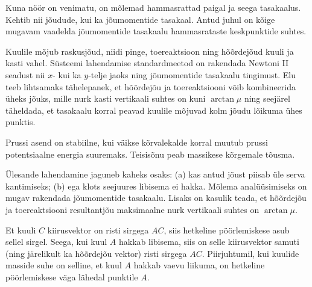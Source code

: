 \documentclass[10pt, twoside]{article}
\begin{document}
{%

\hint
Kuna nöör on venimatu, on mõlemad hammasrattad paigal ja seega tasakaalus. Kehtib nii jõudude, kui ka jõumomentide tasakaal. Antud juhul on kõige mugavam vaadelda jõumomentide tasakaalu hammasrataste keskpunktide suhtes.
\probend
\bigskip


\hint
Kuulile mõjub raskusjõud, niidi pinge, toereaktsioon ning hõõrdejõud kuuli ja kasti vahel. Süsteemi lahendamise standardmeetod on rakendada Newtoni II seadust nii $x$- kui ka $y$-telje jaoks ning jõumomentide tasakaalu tingimust. Elu teeb lihtsamaks tähelepanek, et hõõrdejõu ja toereaktsiooni võib kombineerida üheks jõuks, mille nurk kasti vertikaali suhtes on kuni $\arctan\mu$ ning seejärel täheldada, et tasakaalu korral peavad kuulile mõjuvad kolm jõudu lõikuma ühes punktis.
\probend
\bigskip


\hint
Prussi asend on stabiilne, kui väikse kõrvalekalde korral muutub prussi potentsiaalne energia suuremaks. Teisisõnu peab massikese kõrgemale tõusma.
\probend
\bigskip


\hint
Ülesande lahendamine jaguneb kaheks osaks: (a) kas antud jõust piisab üle serva kantimiseks; (b) ega klots seejuures libisema ei hakka. Mõlema analüüsimiseks on mugav rakendada jõumomentide tasakaalu. Lisaks on kasulik teada, et hõõrdejõu ja toereaktsiooni resultantjõu maksimaalne nurk vertikaali suhtes on $\arctan \mu$.
\probend
\bigskip


\hint
Et kuuli $C$ kiirusvektor on risti sirgega $AC$, siis hetkeline pöörlemiskese asub sellel sirgel. Seega, kui kuul $A$ hakkab libisema, siis on selle kiirusvektor samuti (ning järelikult ka hõõrdejõu vektor) risti sirgega $AC$. Piirjuhtumil, kui kuulide masside suhe on selline, et kuul $A$ hakkab vaevu liikuma, on hetkeline pöörlemiskese väga lähedal punktile $A$.
\probend
\bigskip

}
\end{document}
